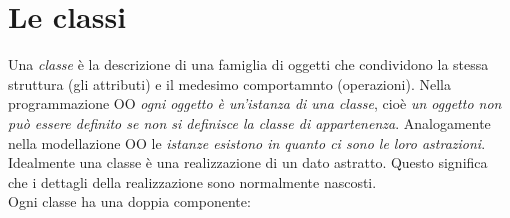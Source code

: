 \documentclass[12pt]{report}
\begin{document}
\section{Le classi}
Una \textit{classe} è la descrizione di una famiglia di oggetti che condividono la stessa struttura (gli attributi) e il medesimo comportamnto (operazioni). Nella programmazione OO \textit{ogni oggetto è un'istanza di una classe}, cioè \textit{un oggetto non può essere definito se non si definisce la classe di appartenenza}. Analogamente nella modellazione OO le \textit{istanze esistono in quanto ci sono le loro astrazioni}. \\
Idealmente una classe è una realizzazione di un dato astratto. Questo significa che i dettagli della realizzazione sono normalmente nascosti. \\
Ogni classe ha una doppia componente:
\end{document}
